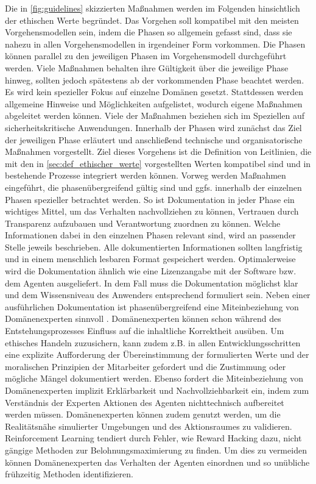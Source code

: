 Die in \autoref{fig:guidelines} skizzierten Maßnahmen werden im Folgenden hinsichtlich der ethischen Werte begründet.
Das Vorgehen soll kompatibel mit den meisten Vorgehensmodellen sein, indem die Phasen so allgemein gefasst sind, dass sie nahezu in allen Vorgehensmodellen in irgendeiner Form vorkommen.
Die Phasen können parallel zu den jeweiligen Phasen im Vorgehensmodell durchgeführt werden.
Viele Maßnahmen behalten ihre Gültigkeit über die jeweilige Phase hinweg, sollten jedoch spätestens ab der vorkommenden Phase beachtet werden.
Es wird kein spezieller Fokus auf einzelne Domänen gesetzt.
Stattdessen werden allgemeine Hinweise und Möglichkeiten aufgelistet, wodurch eigene Maßnahmen abgeleitet werden können.
Viele der Maßnahmen beziehen sich im Speziellen auf sicherheitskritische Anwendungen.
Innerhalb der Phasen wird zunächst das Ziel der jeweiligen Phase erläutert und anschließend technische und organisatorische Maßnahmen vorgestellt.
Ziel dieses Vorgehens ist die Definition von Leitlinien, die mit den in \autoref{sec:def_ethischer_werte} vorgestellten Werten kompatibel sind und in bestehende Prozesse integriert werden können.
\ab 
Vorweg werden Maßnahmen eingeführt, die phasenübergreifend gültig sind und ggfs. innerhalb der einzelnen Phasen spezieller betrachtet werden.
So ist Dokumentation in jeder Phase ein wichtiges Mittel, um das Verhalten nachvollziehen zu können, Vertrauen durch Transparenz aufzubauen und Verantwortung zuordnen zu können.
Welche Informationen dabei in den einzelnen Phasen relevant sind, wird an passender Stelle jeweils beschrieben.
Alle dokumentierten Informationen sollten langfristig und in einem menschlich lesbaren Format gespeichert werden.
Optimalerweise wird die Dokumentation ähnlich wie eine Lizenzangabe mit der Software bzw. dem Agenten ausgeliefert.
In dem Fall muss die Dokumentation möglichst klar und dem Wissensniveau des Anwenders entsprechend formuliert sein.
Neben einer ausführlichen Dokumentation ist phasenübergreifend eine Miteinbeziehung von Domänenexperten sinnvoll \cite[S. 12 ff.]{gottesman2018}.
Domänenexperten können schon während des Entstehungsprozesses Einfluss auf die inhaltliche Korrektheit ausüben.
Um ethisches Handeln zuzusichern, kann zudem z.B. in allen Entwicklungsschritten eine explizite Aufforderung der Übereinstimmung der formulierten Werte und der moralischen Prinzipien der Mitarbeiter gefordert und die Zustimmung oder mögliche Mängel dokumentiert werden.
Ebenso fordert die Miteinbeziehung von Domänenexperten implizit Erklärbarkeit und Nachvollziehbarkeit ein, indem zum Verständnis der Experten Aktionen des Agenten nichttechnisch aufbereitet werden müssen.
Domänenexperten können zudem genutzt werden, um die Realitätsnähe simulierter Umgebungen und des Aktionsraumes zu validieren.
Reinforcement Learning tendiert durch Fehler, wie Reward Hacking dazu, nicht gängige Methoden zur Belohnungsmaximierung zu finden.
Um dies zu vermeiden können Domänenexperten das Verhalten der Agenten einordnen und so unübliche frühzeitig Methoden identifizieren.



